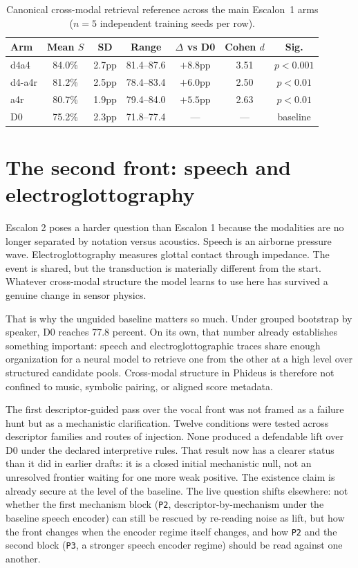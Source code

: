 \begin{table}[ht]
\centering
\caption{Canonical cross-modal retrieval reference across the main Escalon~1 arms ($n = 5$ independent training seeds per row).}
\label{tab:escalon1_multiseed}
\footnotesize
\begin{tabular}{@{}lcccccc@{}}
\toprule
Arm & Mean $S$ & SD & Range & $\Delta$ vs D0 & Cohen $d$ & Sig. \\
\midrule
d4a4 & 84.0\% & 2.7pp & 81.4--87.6 & $+8.8$pp & 3.51 & $p < 0.001$ \\
d4-a4r & 81.2\% & 2.5pp & 78.4--83.4 & $+6.0$pp & 2.50 & $p < 0.01$ \\
a4r & 80.7\% & 1.9pp & 79.4--84.0 & $+5.5$pp & 2.63 & $p < 0.01$ \\
D0 & 75.2\% & 2.3pp & 71.8--77.4 & --- & --- & baseline \\
\bottomrule
\end{tabular}
\end{table}


\section{The second front: speech and electroglottography}


Escalon 2 poses a harder question than Escalon 1 because the modalities are no longer separated by notation versus acoustics. Speech is an airborne pressure wave. Electroglottography measures glottal contact through impedance. The event is shared, but the transduction is materially different from the start. Whatever cross-modal structure the model learns to use here has survived a genuine change in sensor physics.

That is why the unguided baseline matters so much. Under grouped bootstrap by speaker, D0 reaches 77.8 percent. On its own, that number already establishes something important: speech and electroglottographic traces share enough organization for a neural model to retrieve one from the other at a high level over structured candidate pools. Cross-modal structure in Phideus is therefore not confined to music, symbolic pairing, or aligned score metadata.

The first descriptor-guided pass over the vocal front was not framed as a failure hunt but as a mechanistic clarification. Twelve conditions were tested across descriptor families and routes of injection. None produced a defendable lift over D0 under the declared interpretive rules. That result now has a clearer status than it did in earlier drafts: it is a closed initial mechanistic null, not an unresolved frontier waiting for one more weak positive. The existence claim is already secure at the level of the baseline. The live question shifts elsewhere: not whether the first mechanism block (\texttt{P2}, descriptor-by-mechanism under the baseline speech encoder) can still be rescued by re-reading noise as lift, but how the front changes when the encoder regime itself changes, and how \texttt{P2} and the second block (\texttt{P3}, a stronger speech encoder regime) should be read against one another.


